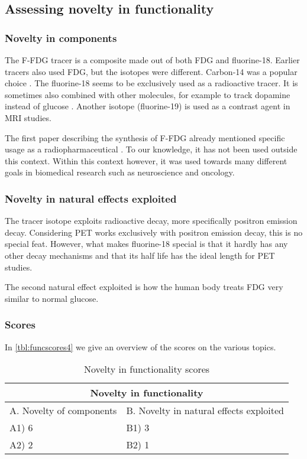 \subsection{Assessing novelty in functionality}

\subsubsection{Novelty in components}
The F-FDG tracer is a composite made out of both FDG and fluorine-18. Earlier
tracers also used FDG, but the isotopes were different. Carbon-14 was a popular
choice \cite{radiopharma}. The fluorine-18 seems to be exclusively used as a
radioactive tracer. It is sometimes also combined with other molecules, for
example to track dopamine instead of glucose \cite{fluorodopa, fdopamine}.
Another isotope (fluorine-19) is used as a contrast agent in MRI studies.

The first paper describing the synthesis of F-FDG already mentioned specific
usage as a radiopharmaceutical \cite{firstF-FDG}. To our knowledge, it has not
been used outside this context. Within this context however, it was used towards
many different goals in biomedical research such as neuroscience and oncology. 

\subsubsection{Novelty in natural effects exploited}
The tracer isotope exploits radioactive decay, more specifically positron
emission decay. Considering PET works exclusively with positron emission decay,
this is no special feat. However, what makes fluorine-18 special is that it
hardly has any other decay mechanisms and that its half life has the ideal
length for PET studies.

The second natural effect exploited is how the human body treats FDG very
similar to normal glucose.

\subsubsection{Scores}
In \autoref{tbl:funcscores4} we give an overview of the scores on the various
topics.

\begin{table}[h]
\centering
\begin{tabular}{l l}
\hline
\multicolumn{2}{|c|}{Novelty in functionality} \\
\hline
A. Novelty of components & B. Novelty in natural effects exploited\\
A1) 6 & B1) 3\\ 
A2) 2 & B2) 1\\ 
\hline
\end{tabular}
\caption{Novelty in functionality scores}
\label{tbl:funcscores4}
\end{table}

